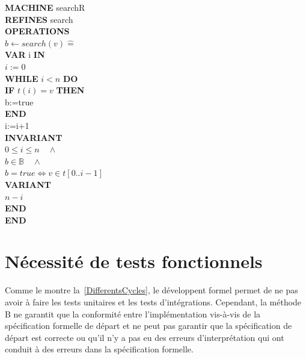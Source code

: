 \documentclass[10pt,a4paper]{article}
\newcommand{\Bequal}{\mathrel{\widehat{=}}}
\begin{document}
{\noindent \textbf{MACHINE} searchR \\
\textbf{REFINES} search \\
\textbf{OPERATIONS} \\
$b \leftarrow search(v) \Bequal$ \\
\hspace*{1em} \textbf{VAR} i \textbf{IN} \\
\hspace*{1em} $i:=0$ \\
\hspace*{1em} \textbf{WHILE} $i < n$ \textbf{DO} \\
\hspace*{2em} \textbf{IF} $t(i)=v$ \textbf{THEN} \\
\hspace*{3em} b:=true \\
\hspace*{2em} \textbf{END} \\
\hspace*{2em} i:=i+1 \\
\hspace*{2em} \textbf{INVARIANT} \\
\hspace*{3em} $0 \leq i \leq n \quad \wedge$ \\
\hspace*{3em} $b \in \mathbb{B} \quad \wedge$ \\
\hspace*{3em} $b = true \Leftrightarrow v \in t[0..i-1]$ \\
\hspace*{2em} \textbf{VARIANT} \\
\hspace*{3em} $n-i$ \\
\hspace*{1em}\textbf{END} \\
\textbf{END} \\
\fi

\section{Nécessité de tests fonctionnels}

Comme le montre la~\cref{DifferentsCycles}, le développent formel permet de ne pas avoir à faire les tests unitaires et les tests d'intégrations. Cependant, la méthode B ne garantit que la conformité entre l'implémentation vis-à-vis de la spécification formelle de départ et ne peut pas garantir que la spécification de départ est correcte ou qu'il n'y a pas eu des erreurs d'interprétation qui ont conduit à des erreurs dans la spécification formelle.

}
\end{document}
